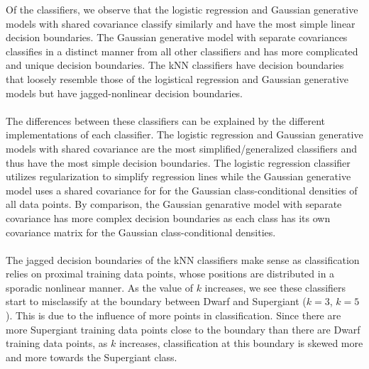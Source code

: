 \documentclass[submit]{harvardml}
\begin{document}
Of the classifiers, we observe that the logistic regression and Gaussian generative models with shared covariance classify similarly and have the most simple linear decision boundaries. The Gaussian generative model with separate covariances classifies in a distinct manner from all other classifiers and has more complicated and unique decision boundaries.
The kNN classifiers have decision boundaries that loosely resemble those of the logistical regression and Gaussian generative models but have jagged-nonlinear decision boundaries.  \\ \\
The differences between these classifiers can be explained by the different implementations of each classifier. 
The logistic regression and Gaussian generative models with shared covariance are the most simplified/generalized classifiers and thus have the most simple decision boundaries. The logistic regression classifier utilizes regularization to simplify regression lines while the Gaussian generative model uses a shared covariance for for the Gaussian class-conditional densities of all data points. By comparison, the Gaussian genarative model with separate covariance has more complex decision boundaries as each class has its own covariance matrix for the Gaussian class-conditional densities. \\ \\
The jagged decision boundaries of the kNN classifiers make sense as classification relies on proximal training data points, whose positions are distributed in a sporadic nonlinear manner. As the value of $k$ increases, we see these classifiers start to misclassify at the boundary between Dwarf and Supergiant ($k=3$, $k=5$). This is due to the influence of more points in classification. Since there are more Supergiant training data points close to the boundary than there are Dwarf training data points, as $k$ increases, classification at this boundary is skewed more and more towards the Supergiant class.
\end{document}
